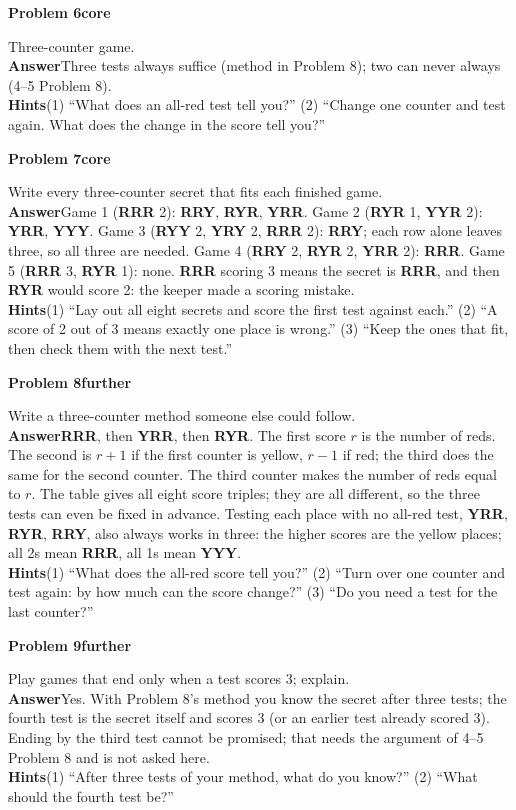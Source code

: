 \documentclass[11pt]{article}
\newcommand{\cd}[1]{\mbox{\textsf{\textbf{#1}}}}   %
\newcommand{\core}{\textcolor{tagcore}{\textbf{core}}}
\newcommand{\further}{\textcolor{tagmore}{\textbf{further}}}
\newcommand{\pb}[3]{\par\needspace{5\baselineskip}\medskip\textbf{Problem #1}\enspace{\small page #2}\enspace\textperiodcentered\enspace #3\par\nopagebreak}
\newcommand{\lab}[1]{\textbf{#1}\enspace}
\newcommand{\hints}[1]{\lab{Hints}#1}
\begin{document}
\pb{6}{5}{\core}
Three-counter game.\\
\lab{Answer}Three tests always suffice (method in Problem 8); two can never always (4--5 Problem 8).\\
\hints{(1) ``What does an all-red test tell you?'' (2) ``Change one counter and test again. What does the change in the score tell you?''}

\pb{7}{6}{\core}
Write every three-counter secret that fits each finished game.\\
\lab{Answer}Game 1 (\cd{RRR} 2): \cd{RRY}, \cd{RYR}, \cd{YRR}. Game 2 (\cd{RYR} 1, \cd{YYR} 2): \cd{YRR}, \cd{YYY}. Game 3 (\cd{RYY} 2, \cd{YRY} 2, \cd{RRR} 2): \cd{RRY}; each row alone leaves three, so all three are needed. Game 4 (\cd{RRY} 2, \cd{RYR} 2, \cd{YRR} 2): \cd{RRR}. Game 5 (\cd{RRR} 3, \cd{RYR} 1): none. \cd{RRR} scoring 3 means the secret is \cd{RRR}, and then \cd{RYR} would score 2: the keeper made a scoring mistake.\\
\hints{(1) ``Lay out all eight secrets and score the first test against each.'' (2) ``A score of 2 out of 3 means exactly one place is wrong.'' (3) ``Keep the ones that fit, then check them with the next test.''}

\pb{8}{7}{\further}
\begin{minipage}[t]{0.66\linewidth}
Write a three-counter method someone else could follow.\\
\lab{Answer}\cd{RRR}, then \cd{YRR}, then \cd{RYR}. The first score $r$ is the number of reds. The second is $r+1$ if the first counter is yellow, $r-1$ if red; the third does the same for the second counter. The third counter makes the number of reds equal to $r$. The table gives all eight score triples; they are all different, so the three tests can even be fixed in advance. Testing each place with no all-red test, \cd{YRR}, \cd{RYR}, \cd{RRY}, also always works in three: the higher scores are the yellow places; all 2s mean \cd{RRR}, all 1s mean \cd{YYY}.\\
\hints{(1) ``What does the all-red score tell you?'' (2) ``Turn over one counter and test again: by how much can the score change?'' (3) ``Do you need a test for the last counter?''}
\end{minipage}\hfill
\begin{minipage}[t]{0.3\linewidth}\vspace{0pt}\small

\end{minipage}

\pb{9}{8}{\further}
Play games that end only when a test scores 3; explain.\\
\lab{Answer}Yes. With Problem 8's method you know the secret after three tests; the fourth test is the secret itself and scores 3 (or an earlier test already scored 3). Ending by the third test cannot be promised; that needs the argument of 4--5 Problem 8 and is not asked here.\\
\hints{(1) ``After three tests of your method, what do you know?'' (2) ``What should the fourth test be?''}
\end{document}
